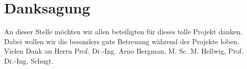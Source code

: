 \documentclass[conference,twocolumn]{IEEEtran}
\begin{document}


%

\section*{Danksagung}
An dieser Stelle möchten wir allen beteiligten für dieses tolle Projekt danken. Dabei wollen wir die besonders gute Betreuung während der Projekte loben. Vielen Dank an Herrn Prof. Dr.-Ing. Arno Bergman, M. Sc. M. Hellwig, Prof. Dr.-Ing. Schugt.

\ifCLASSOPTIONcaptionsoff
  \newpage
\fi

\end{document}
